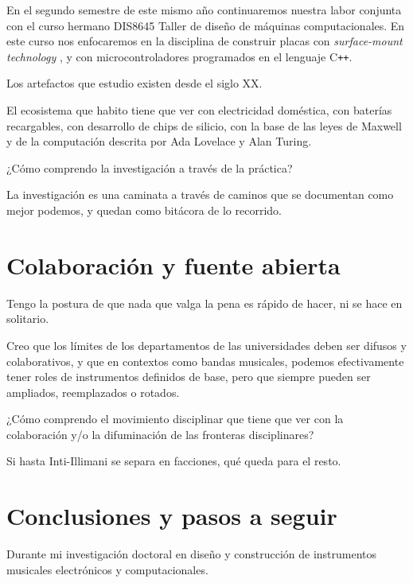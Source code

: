 \documentclass{article}
\begin{document}
En el segundo semestre de este mismo año continuaremos nuestra labor conjunta con el curso hermano DIS8645 Taller de diseño de máquinas computacionales. En este curso nos enfocaremos en la disciplina de construir placas con \textit{surface-mount technology} \cite{smt}, y con microcontroladores programados en el lenguaje C\texttt{++}.


Los artefactos que estudio existen desde el siglo XX.

El ecosistema que habito tiene que ver con electricidad doméstica, con baterías recargables, con desarrollo de chips de silicio, con la base de las leyes de Maxwell y de la computación descrita por Ada Lovelace y Alan Turing.

¿Cómo comprendo la investigación a través de la práctica?

La investigación es una caminata a través de caminos que se documentan como mejor podemos, y quedan como bitácora de lo recorrido.

\section{Colaboración y fuente abierta}

Tengo la postura de que nada que valga la pena es rápido de hacer, ni se hace en solitario.

Creo que los límites de los departamentos de las universidades deben ser difusos y colaborativos, y que en contextos como bandas musicales, podemos efectivamente tener roles de instrumentos definidos de base, pero que siempre pueden ser ampliados, reemplazados o rotados.

¿Cómo comprendo el movimiento disciplinar que tiene que ver con la colaboración y/o la difuminación de las fronteras disciplinares?

Si hasta Inti-Illimani se separa en facciones, qué queda para el resto.

\section{Conclusiones y pasos a seguir}

Durante mi investigación doctoral en diseño y construcción de instrumentos musicales electrónicos y computacionales.

\printbibliography[title={Bibliografía}, heading=bibintoc]
\end{document}
